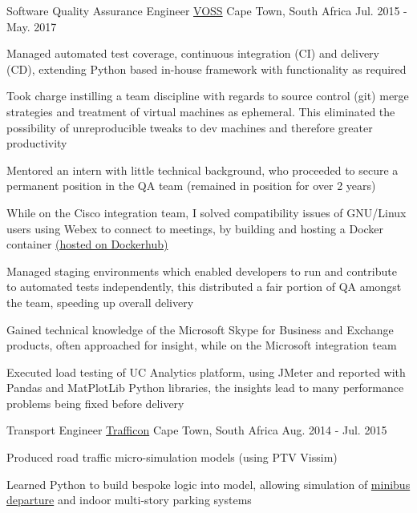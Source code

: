 \begin{cventries}
  \cventry
    {Software Quality Assurance Engineer} %
    {\href{https://www.voss-solutions.com}{VOSS}} %
    {Cape Town, South Africa} %
    {Jul. 2015 - May. 2017} %
    {
      \begin{cvitems} %
        \item {Managed automated test coverage, continuous integration (CI) and delivery (CD), extending Python based in-house framework with functionality as required}
        \item {Took charge instilling a team discipline with regards to source control (git) merge strategies and treatment of virtual machines as ephemeral. This eliminated the possibility of unreproducible tweaks to dev machines and therefore greater productivity}
        \item {Mentored an intern with little technical background, who proceeded to secure a permanent position in the QA team (remained in position for over 2 years)}
        \item {While on the Cisco integration team, I solved compatibility issues of GNU/Linux users using Webex to connect to meetings, by building and hosting a Docker container \href{https://hub.docker.com/r/dnk8n/docker-webex}{(hosted on Dockerhub)}}
        \item {Managed staging environments which enabled developers to run and contribute to automated tests independently, this distributed a fair portion of QA amongst the team, speeding up overall delivery}
        \item {Gained technical knowledge of the Microsoft Skype for Business and Exchange products, often approached for insight, while on the Microsoft integration team}
        \item {Executed load testing of UC Analytics platform, using JMeter and reported with Pandas and MatPlotLib Python libraries, the insights lead to many performance problems being fixed before delivery}
      \end{cvitems}
    }

  \cventry
    {Transport Engineer} %
    {\href{http://trafficon.co.za}{Trafficon}} %
    {Cape Town, South Africa} %
    {Aug. 2014 - Jul. 2015} %
    {
      \begin{cvitems} %
        \item {Produced road traffic micro-simulation models (using PTV Vissim)}
        \item {Learned Python to build bespoke logic into model, allowing simulation of \href{https://www.youtube.com/watch?v=RjTvDzyl8WA}{minibus departure} and indoor multi-story parking systems}
      \end{cvitems}
    }

\end{cventries}
